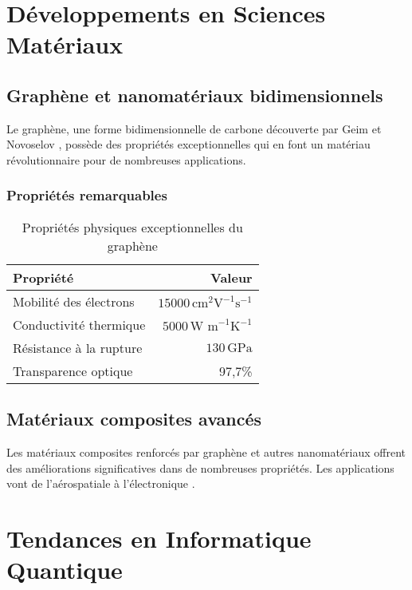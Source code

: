\documentclass[12pt,a4paper,twoside,openright,openany]{book}
\begin{document}
	\chapter{Développements en Sciences Matériaux}
	\label{ch:materiaux}
	
	\section{Graphène et nanomatériaux bidimensionnels}
	
	Le graphène, une forme bidimensionnelle de carbone découverte par Geim et Novoselov \cite{Novoselov2004}, possède des propriétés exceptionnelles qui en font un matériau révolutionnaire pour de nombreuses applications.
	
	\subsection{Propriétés remarquables}
	
	\begin{table}[H]
		\centering
		\begin{tabular}{|l|r|}
			\hline
			\textbf{Propriété} & \textbf{Valeur} \\
			\hline
			Mobilité des électrons & $15000 \, \text{cm}^2\text{V}^{-1}\text{s}^{-1}$ \\
			\hline
			Conductivité thermique & $5000 \, \text{W m}^{-1}\text{K}^{-1}$ \\
			\hline
			Résistance à la rupture & $130 \, \text{GPa}$ \\
			\hline
			Transparence optique & 97,7\% \\
			\hline
		\end{tabular}
		\caption{Propriétés physiques exceptionnelles du graphène}
		\label{tab:graphene}
	\end{table}
	
	\section{Matériaux composites avancés}
	
	Les matériaux composites renforcés par graphène et autres nanomatériaux offrent des améliorations significatives dans de nombreuses propriétés. Les applications vont de l'aérospatiale à l'électronique \cite{Yoo2014}.
	
	\newpage
	
	\chapter{Tendances en Informatique Quantique}
	\label{ch:quantique}
	
\end{document}
